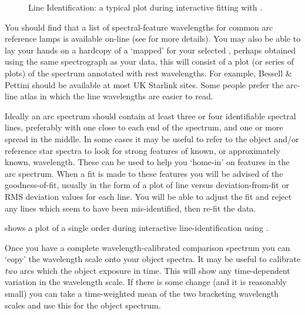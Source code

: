 \begin{figure}
\begin{center}
{\leavevmode\epsfysize=136mm}

\parbox{140mm}{
\caption{Line Identification: a typical plot during interactive fitting
         with .}
\label{fi_echarc_plot}
}
\end{center}
\end{figure}

You should find that a list of spectral-feature wavelengths for
common arc reference lamps is available on-line (see
 for more details).
You may also be able to lay your hands on a hardcopy of a `mapped'
 for your selected
,  perhaps obtained using
the same spectrograph as your data, this will consist of a plot
(or series of plots) of the spectrum annotated with rest wavelengths.
For example, Bessell \& Pettini\cite{echref} should be available
at most UK Starlink sites.
Some people prefer the  arc-line atlas\cite{eso_main}
in which the line wavelengths are easier to read.

Ideally an arc spectrum should contain at least three or four
identifiable spectral lines, preferably with one close to each
end of the spectrum, and one or more spread in the middle.
In some cases it may be useful to refer to the object and/or reference star
spectra to look for strong features of known, or approximately known,
wavelength.
These can be used to help you `home-in' on features in the arc spectrum.
When a fit is made to these features you will be advised of the
goodness-of-fit, usually in the form of a plot of line versus
deviation-from-fit or RMS deviation values for each line.
You will be able to adjust the fit and reject any lines which
seem to have been mis-identified, then re-fit the data.

 shows a plot of a
single order during interactive line-identification using
.

Once you have a complete wavelength-calibrated comparison spectrum you
can `copy' the wavelength scale onto your object spectra.
It may be useful to calibrate {\em two} arcs which
 the object exposure in time.
This will show any time-dependent variation in the wavelength scale.
If there is some change (and it is reasonably small) you can
take a time-weighted mean of the two bracketing wavelength scales and use
this for the object spectrum.


